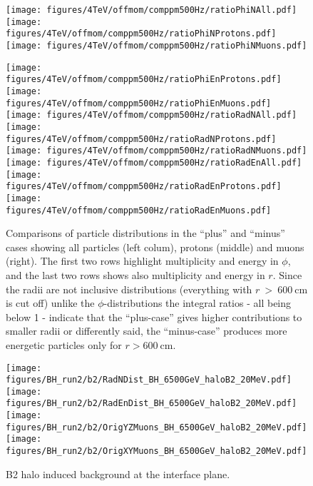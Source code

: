 \begin{figure}%
\begin{center}
  \texttt{[image: figures/4TeV/offmom/comppm500Hz/ratioPhiNAll.pdf]}
  \texttt{[image: figures/4TeV/offmom/comppm500Hz/ratioPhiNProtons.pdf]}
  \texttt{[image: figures/4TeV/offmom/comppm500Hz/ratioPhiNMuons.pdf]}

  \texttt{[image: figures/4TeV/offmom/comppm500Hz/ratioPhiEnProtons.pdf]}
  \texttt{[image: figures/4TeV/offmom/comppm500Hz/ratioPhiEnMuons.pdf]}
  \texttt{[image: figures/4TeV/offmom/comppm500Hz/ratioRadNAll.pdf]}
  \texttt{[image: figures/4TeV/offmom/comppm500Hz/ratioRadNProtons.pdf]}
  \texttt{[image: figures/4TeV/offmom/comppm500Hz/ratioRadNMuons.pdf]}
  \texttt{[image: figures/4TeV/offmom/comppm500Hz/ratioRadEnAll.pdf]}
  \texttt{[image: figures/4TeV/offmom/comppm500Hz/ratioRadEnProtons.pdf]}
  \texttt{[image: figures/4TeV/offmom/comppm500Hz/ratioRadEnMuons.pdf]}
\end{center}
\vspace{-0.6cm}
\caption{Comparisons of particle distributions in the ``plus'' and ``minus'' cases showing all particles (left colum), protons (middle) and muons (right). 
The first two rows highlight multiplicity and energy in $\phi$, and the last two rows shows also multiplicity and energy in $r$. Since the radii are not inclusive distributions (everything with $r~>~600~$cm is cut off) unlike the $\phi$-distributions the integral ratios - all being below 1 - indicate that the ``plus-case'' gives higher contributions to smaller radii or differently said, the ``minus-case'' produces more energetic particles only for $r > 600~$cm. 
  \label{compPM_phien}}
\end{figure}
\newpage


\begin{figure}%
\centering
\texttt{[image: figures/BH\_run2/b2/RadNDist\_BH\_6500GeV\_haloB2\_20MeV.pdf]}
\texttt{[image: figures/BH\_run2/b2/RadEnDist\_BH\_6500GeV\_haloB2\_20MeV.pdf]}
\texttt{[image: figures/BH\_run2/b2/OrigYZMuons\_BH\_6500GeV\_haloB2\_20MeV.pdf]}
\texttt{[image: figures/BH\_run2/b2/OrigXYMuons\_BH\_6500GeV\_haloB2\_20MeV.pdf]}
 \caption{B2 halo induced background at the interface plane. 
  \label{dist6500GeVB22}}
\end{figure}

